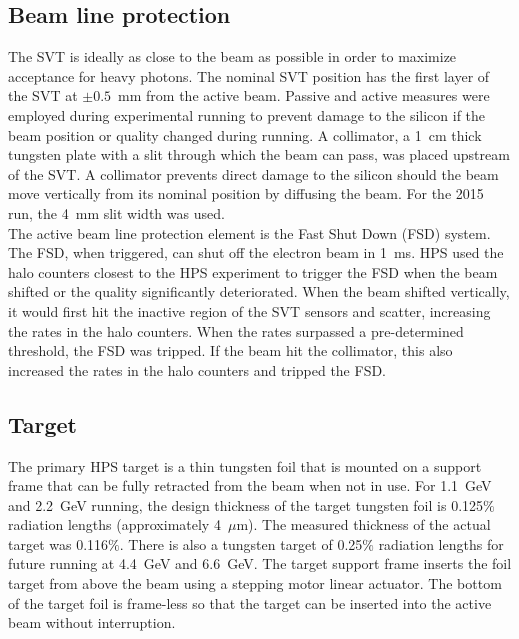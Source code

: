 \subsection{Beam line protection}
The SVT is ideally as close to the beam as possible in order to maximize acceptance for heavy photons. The nominal SVT position has the first layer of the SVT at $\pm0.5$~mm from the active beam. Passive and active measures were employed during experimental running to prevent damage to the silicon if the beam position or quality changed during running. A collimator, a 1~cm thick tungsten plate with a slit through which the beam can pass, was placed upstream of the SVT. A collimator prevents direct damage to the silicon should the beam move vertically from its nominal position by diffusing the beam. For the 2015 run, the 4~mm slit width was used. \\
\indent The active beam line protection element is the Fast Shut Down (FSD) system. The FSD, when triggered, can shut off the electron beam in 1~ms. HPS used the halo counters closest to the HPS experiment to trigger the FSD when the beam shifted or the quality significantly deteriorated. When the beam shifted vertically, it would first hit the inactive region of the SVT sensors and scatter, increasing the rates in the halo counters. When the rates surpassed a pre-determined threshold, the FSD was tripped. If the beam hit the collimator, this also increased the rates in the halo counters and tripped the FSD. 

\subsection{Target}

The primary HPS target is a thin tungsten foil that is mounted on a support frame that can be fully retracted from the beam when not in use. For 1.1~GeV and 2.2~GeV running, the design thickness of the target tungsten foil is 0.125$\%$ radiation lengths (approximately 4~$\mu$m). The measured thickness of the actual target was 0.116$\%$. There is also a tungsten target of 0.25$\%$ radiation lengths for future running at 4.4~GeV and 6.6~GeV. The target support frame inserts the foil target from above the beam using a stepping motor linear actuator. The bottom of the target foil is frame-less so that the target can be inserted into the active beam without interruption.   

